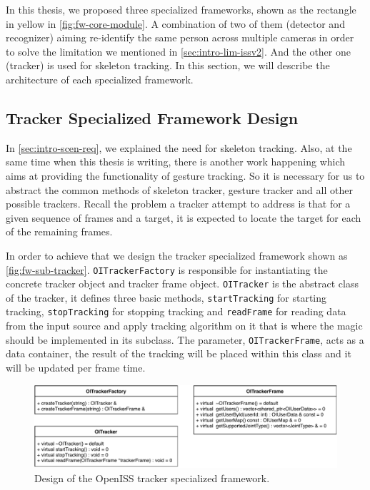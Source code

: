 In this thesis, we proposed three specialized frameworks, shown as the
rectangle in yellow in \autoref{fig:fw-core-module}. A combination of two
of them (detector and recognizer) aiming re-identify the same person across
multiple cameras in order to solve the limitation we mentioned in
\autoref{sec:intro-lim-issv2}.
And the other one (tracker) is used for skeleton tracking.
In this section, we will describe the architecture of each specialized
framework.

\subsection{Tracker Specialized Framework Design}
\label{sec:fw-design-spec-tracker}

In \autoref{sec:intro-scen-req}, we explained the need for skeleton tracking.
Also, at the same time when this thesis is writing, there is another work
happening which aims at providing the functionality of gesture tracking. So it
is necessary for us to abstract the common methods of skeleton tracker, gesture
tracker and all other possible trackers.
Recall the problem a tracker attempt to address is that for a given sequence of
frames and a target, it is expected to locate the target for each of the
remaining frames.

In order to achieve that we design the tracker specialized framework shown as
\autoref{fig:fw-sub-tracker}. \texttt{OITrackerFactory} is responsible for
instantiating the concrete tracker object and tracker frame object.
\texttt{OITracker} is the abstract class of the tracker, it defines three basic
methods, \texttt{startTracking} for starting tracking, \texttt{stopTracking}
for stopping tracking and \texttt{readFrame} for reading data from the input
source and apply tracking algorithm on it that is where the magic should be
implemented in its subclass. The parameter, \texttt{OITrackerFrame}, acts as a
data container, the result of the tracking will be placed within this class and
it will be updated per frame time.

\begin{figure}
    \centering
    \includegraphics[width=\linewidth]{figures/framework_sub_tracker.pdf}
    \caption{Design of the OpenISS tracker specialized framework.}
    \label{fig:fw-sub-tracker}
\end{figure}

